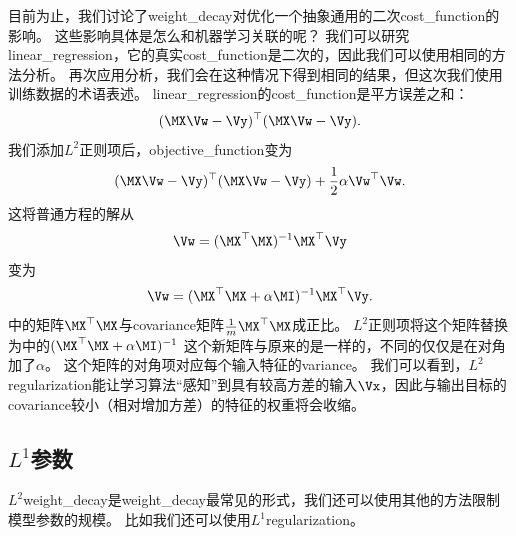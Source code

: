 目前为止，我们讨论了\gls{weight_decay}对优化一个抽象通用的二次\gls{cost_function}的影响。
这些影响具体是怎么和机器学习关联的呢？
我们可以研究\gls{linear_regression}，它的真实\gls{cost_function}是二次的，因此我们可以使用相同的方法分析。
再次应用分析，我们会在这种情况下得到相同的结果，但这次我们使用训练数据的术语表述。
\gls{linear_regression}的\gls{cost_function}是平方误差之和：
\begin{align}
 (\MX \Vw - \Vy)^\top (\MX \Vw - \Vy).
\end{align}
我们添加$L^2$正则项后，\gls{objective_function}变为
\begin{align}
  (\MX \Vw - \Vy)^\top (\MX \Vw - \Vy) + \frac{1}{2}\alpha \Vw^\top \Vw.
\end{align}
这将普通方程的解从
\begin{align}
\label{eq:716w}
  \Vw = (\MX^\top \MX)^{-1} \MX^\top \Vy
\end{align}
变为
\begin{align}
\label{eq:717mw}
   \Vw = (\MX^\top \MX + \alpha \MI)^{-1} \MX^\top \Vy .
\end{align}
中的矩阵$\MX^\top\MX$与\gls{covariance}矩阵$\frac{1}{m}\MX^\top\MX$成正比。
$L^2$正则项将这个矩阵替换为中的$ (\MX^\top \MX + \alpha \MI)^{-1}$
这个新矩阵与原来的是一样的，不同的仅仅是在对角加了$\alpha$。
这个矩阵的对角项对应每个输入特征的\gls{variance}。
我们可以看到，$L^2$\gls{regularization}能让学习算法``感知''到具有较高方差的输入$\Vx$，因此与输出目标的\gls{covariance}较小（相对增加方差）的特征的权重将会收缩。

\subsection{$L^1$参数}
\label{sec:l1_regularization}
$L^2$\gls{weight_decay}是\gls{weight_decay}最常见的形式，我们还可以使用其他的方法限制模型参数的规模。
比如我们还可以使用$L^1$\gls{regularization}。

